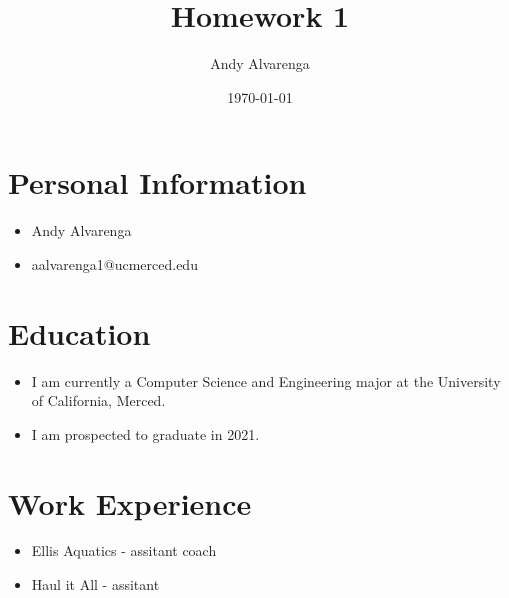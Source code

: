 \documentclass[11pt]{article}
\title{Homework 1}
\author{Andy Alvarenga}
\date{\today}
\begin{document}
\maketitle

\section{Personal Information}

\begin{itemize}
\item Andy Alvarenga 
\item aalvarenga1@ucmerced.edu
\end{itemize}

\section{Education}

\begin{itemize}
\item I am currently a Computer Science and Engineering major at the University of California, Merced.
\item I am prospected to graduate in 2021.
\end{itemize}

\section{Work Experience}

\begin{itemize}
\item Ellis Aquatics - assitant coach 
\item Haul it All - assitant
\end{itemize}
\end{document}
